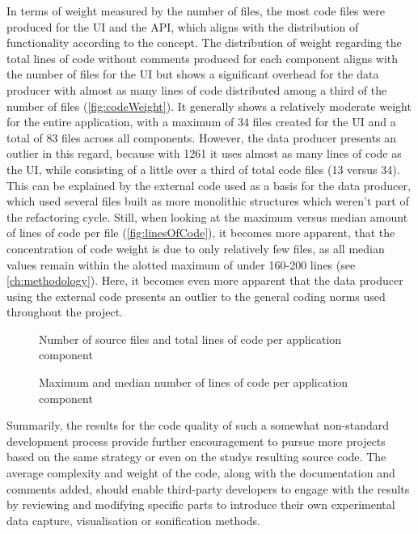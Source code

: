 In terms of weight measured by the number of files, the most code files were produced for the \ac{UI} and the \ac{API}, which aligns with the distribution of functionality according to the concept.
The distribution of weight regarding the total lines of code without comments produced for each component aligns with the number of files for the \ac{UI} but shows a significant overhead for the data producer with almost as many lines of code distributed among a third of the number of files (\autoref{fig:codeWeight}).
It generally shows a relatively moderate weight for the entire application, with a maximum of 34 files created for the \ac{UI} and a total of 83 files across all components.
However, the data producer presents an outlier in this regard, because with 1261 it uses almost as many lines of code as the  \ac{UI}, while consisting of a little over a third of total code files (13 versus 34).
This can be explained by the external code used as a basis for the data producer, which used several files built as more monolithic structures which weren't part of the refactoring cycle.
Still, when looking at the maximum versus median amount of lines of code per file (\autoref{fig:linesOfCode}), it becomes more apparent, that the concentration of code weight is due to only relatively few files, as all median values remain within the alotted maximum of under 160-200 lines (see \autoref{ch:methodology}).
Here, it becomes even more apparent that the data producer using the external code presents an outlier to the general coding norms used throughout the project.

\begin{figure*}[!ht]
\hfill

\caption[Source file count and total lines of code]{Number of source files and total lines of code per application component\protect}
\label{fig:codeWeight}
\end{figure*}

\begin{figure}[!ht]
\centering

\caption[Lines of code]{Maximum and median number of lines of code per application component\protect}
\label{fig:linesOfCode}
\end{figure}

Summarily, the results for the code quality of such a somewhat non-standard development process provide further encouragement to pursue more projects based on the same strategy or even on the study\textquotesingle s resulting source code.
The average complexity and weight of the code, along with the documentation and comments added, should enable third-party developers to engage with the results by reviewing and modifying specific parts to introduce their own experimental data capture, visualisation or sonification methods.

